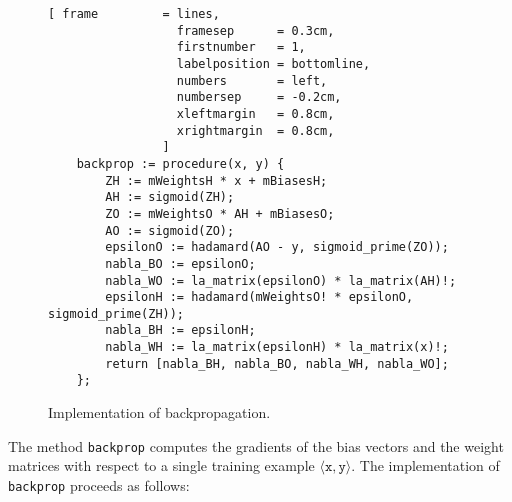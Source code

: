 \begin{figure}[!ht]
\centering
\begin{Verbatim}[ frame         = lines, 
                  framesep      = 0.3cm, 
                  firstnumber   = 1,
                  labelposition = bottomline,
                  numbers       = left,
                  numbersep     = -0.2cm,
                  xleftmargin   = 0.8cm,
                  xrightmargin  = 0.8cm,
                ]
    backprop := procedure(x, y) {
        ZH := mWeightsH * x + mBiasesH;
        AH := sigmoid(ZH);
        ZO := mWeightsO * AH + mBiasesO;
        AO := sigmoid(ZO);
        epsilonO := hadamard(AO - y, sigmoid_prime(ZO));
        nabla_BO := epsilonO;
        nabla_WO := la_matrix(epsilonO) * la_matrix(AH)!;
        epsilonH := hadamard(mWeightsO! * epsilonO, sigmoid_prime(ZH));
        nabla_BH := epsilonH;
        nabla_WH := la_matrix(epsilonH) * la_matrix(x)!;
        return [nabla_BH, nabla_BO, nabla_WH, nabla_WO];
    };
\end{Verbatim}
\vspace*{-0.3cm}
\caption{Implementation of backpropagation.}
\label{fig:nn.stlx}
\end{figure}
The method \texttt{backprop} computes the gradients of the bias vectors and the weight matrices with respect to
a single training example $\langle \texttt{x}, \texttt{y} \rangle$.  The implementation of \texttt{backprop}
proceeds as follows:
